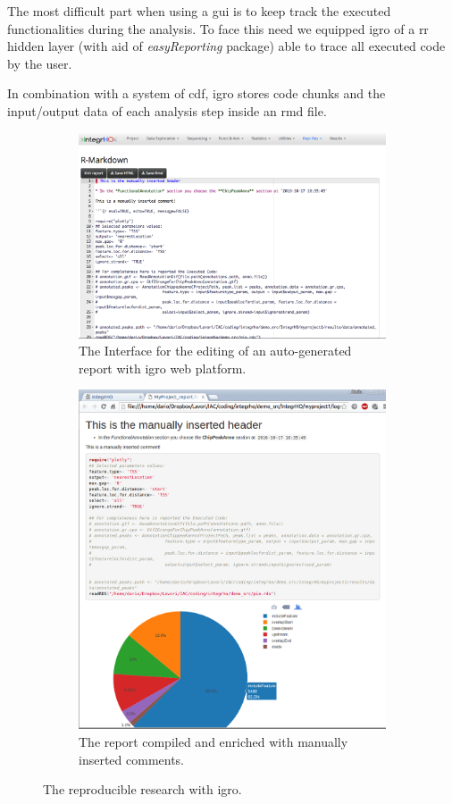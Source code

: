 The most difficult part when using a \gls{gui} is to keep track the executed functionalities during the analysis.
To face this need we equipped \gls{igro} of a \gls{rr} hidden layer (with aid of \textit{easyReporting} package) able to trace all executed code by the user.

In combination with a system of \gls{cdf}, \gls{igro} stores code chunks and the input/output data of each analysis step inside an \gls{rmd} file.

\begin{figure}
\centering
\begin{subfigure}{.5\textwidth}
  \centering
  \includegraphics[width=.9\linewidth]{img/integrho/rr_1.png}
  \caption{The Interface for the editing of an auto-generated report with \gls{igro} web platform.}
  \label{fig:integrhorr1}
\end{subfigure}%
\begin{subfigure}{.5\textwidth}
  \centering
  \includegraphics[width=.9\linewidth]{img/integrho/rr_2.png}
  \caption{The report compiled and enriched with manually inserted comments.}
  \label{fig:integrhorr2}
\end{subfigure}
\caption[\gls{igro} report editing]{The reproducible research with \gls{igro}.}
\label{fig:integrhorr}
\end{figure}

